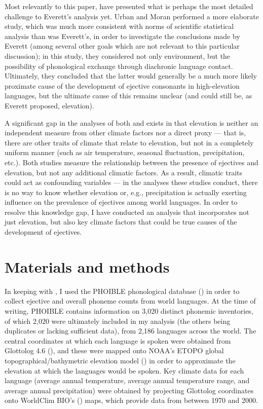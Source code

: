 \documentclass{article}
\begin{document}
Most relevantly to this paper, \textcite{urban2021} have presented what is perhaps the most detailed challenge to Everett's analysis yet. Urban and Moran performed a more elaborate study, which was much more consistent with norms of scientific statistical analysis than was Everett's, in order to investigate the conclusions made by Everett (among several other goals which are not relevant to this particular discussion); in this study, they considered not only environment, but the possibility of phonological exchange through diachronic language contact. Ultimately, they concluded that the latter would generally be a much more likely proximate cause of the development of ejective consonants in high-elevation languages, but the ultimate cause of this remains unclear (and could still be, as Everett proposed, elevation).

A significant gap in the analyses of both \textcite{everett2013} and \textcite{urban2021} exists in that elevation is neither an independent measure from other climate factors nor a direct proxy --- that is, there are other traits of climate that relate to elevation, but not in a completely uniform manner (such as air temperature, seasonal fluctuation, precipitation, etc.). Both studies measure the relationship between the presence of ejectives and elevation, but not any additional climatic factors. As a result, climatic traits could act as confounding variables --- in the analyses these studies conduct, there is no way to know whether elevation or, e.g., precipitation is actually exerting influence on the prevalence of ejectives among world languages. In order to resolve this knowledge gap, I have conducted an analysis that incorporates not just elevation, but also key climate factors that could be true causes of the development of ejectives.

\section{Materials and methods}

In keeping with \textcite{urban2021}, I used the PHOIBLE phonological database (\cite{phoible}) in order to collect ejective and overall phoneme counts from world languages. At the time of writing, PHOIBLE contains information on 3,020 distinct phonemic inventories, of which 2,020 were ultimately included in my analysis (the others being duplicates or lacking sufficient data), from 2,186 languages across the world. The central coordinates at which each language is spoken were obtained from Glottolog 4.6 (\cite{glottolog}), and these were mapped onto NOAA's ETOPO global topographical/bathymetric elevation model (\cite{etopo}) in order to approximate the elevation at which the languages would be spoken. Key climate data for each language (average annual temperature, average annual temperature range, and average annual precipitation) were obtained by projecting Glottolog coordinates onto WorldClim BIO's (\cite{worldclim}) maps, which provide data from between 1970 and 2000.
\end{document}
